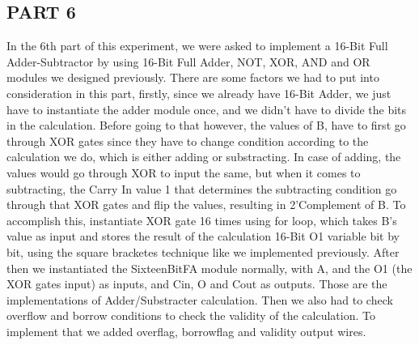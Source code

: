 \documentclass[pdftex,12pt,a4paper]{article}
\begin{document}
\newpage
\subsection{PART 6}
In the 6th part of this experiment, we were asked to implement a 16-Bit Full Adder-Subtractor by using 16-Bit Full Adder, NOT, XOR, AND and OR modules we designed previously. There are some factors we had to put into consideration in this part, firstly, since we already have 16-Bit Adder, we just have to instantiate the adder module once, and we didn't have to divide the bits in the calculation. Before going to that however, the values of B, have to first go through XOR gates since they have to change condition according to the calculation we do, which is either adding or substracting. In case of adding, the values would go through XOR to input the same, but when it comes to subtracting, the Carry In value 1 that determines the subtracting condition go through that XOR gates and flip the values, resulting in 2'Complement of B. To accomplish this, instantiate XOR gate 16 times using for loop, which takes B's value as input and stores the result of the calculation 16-Bit O1 variable bit by bit, using the square bracketes technique like we implemented previously. After then we instantiated the SixteenBitFA module normally, with A, and the O1 (the XOR gates input) as inputs, and Cin, O and Cout as outputs. Those are the implementations of Adder/Substracter calculation. Then we also had to check overflow and borrow conditions to check the validity of the calculation. To implement that we added overflag, borrowflag and validity output wires. 
\end{document}
